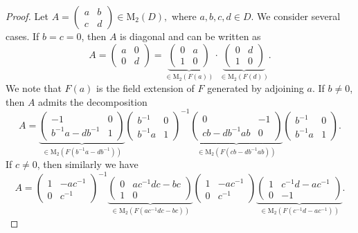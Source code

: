 \documentclass[11pt]{article}
\theoremstyle{definition}
\begin{document}
{{{{				
				\begin{proof}
					Let
					$
					A =
					\begin{pmatrix}
						a & b \\
						c & d
					\end{pmatrix}
					\in \mathrm{M}_2(D),
					$
					where \( a, b, c, d \in D \). We consider several cases. 	If \( b = c = 0 \), then \( A \) is diagonal and can be written as
					\[
					A =
					\begin{pmatrix}
						a & 0 \\
						0 & d
					\end{pmatrix}
					=
					\underbrace{
						\begin{pmatrix}
							0 & a \\
							1 & 0
						\end{pmatrix}
					}_{\in \mathrm{M}_2(F(a))}
					\cdot
					\underbrace{
						\begin{pmatrix}
							0 & d \\
							1 & 0
						\end{pmatrix}
					}_{\in \mathrm{M}_2(F(d))}.
					\] We note that $F(a)$ is the field extension of $F$ generated by adjoining $a$. If \( b \neq 0 \), then \( A \) admits the decomposition
					\[
					A =
					\underbrace{
						\begin{pmatrix}
							-1 & 0 \\
							b^{-1}a - db^{-1} & 1
						\end{pmatrix}
					}_{\in \mathrm{M}_2(F(b^{-1}a - db^{-1}))}
					\begin{pmatrix}
						b^{-1} & 0 \\
						b^{-1}a & 1
					\end{pmatrix}^{-1}
					\underbrace{
						\begin{pmatrix}
							0 & -1 \\
							cb - db^{-1}ab & 0
						\end{pmatrix}
					}_{\in \mathrm{M}_2(F(cb - db^{-1}ab))}
					\begin{pmatrix}
						b^{-1} & 0 \\
						b^{-1}a & 1
					\end{pmatrix}.
					\]	If \( c \neq 0 \), then similarly we have
					\[
					A =
					\begin{pmatrix}
						1 & -ac^{-1} \\
						0 & c^{-1}
					\end{pmatrix}^{-1}
					\underbrace{
						\begin{pmatrix}
							0 & ac^{-1}dc - bc \\
							1 & 0
						\end{pmatrix}
					}_{\in \mathrm{M}_2(F(ac^{-1}dc - bc))}
					\begin{pmatrix}
						1 & -ac^{-1} \\
						0 & c^{-1}
					\end{pmatrix}
					\underbrace{
						\begin{pmatrix}
							1 & c^{-1}d - ac^{-1} \\
							0 & -1
						\end{pmatrix}
					}_{\in \mathrm{M}_2(F(c^{-1}d - ac^{-1}))}.
					\]
					

\end{proof}}}}}
\end{document}
